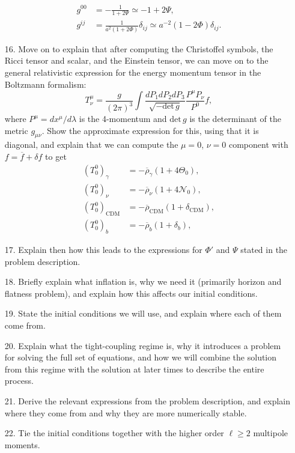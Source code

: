 \documentclass{aa}
\begin{document}
\begin{enumerate}
  \begin{align}
    g^{00} &= -\frac{1}{1+2\Psi} \simeq -1+2\Psi,
    \\
    g^{ij} &= \frac{1}{a^2\left(1+2\Phi \right)}\delta_{ij} \simeq a^{-2}\left(1-2\Phi\right)\delta_{ij}.
  \end{align}
  \item [16.] Move on to explain that after computing the Christoffel symbols, the Ricci tensor and scalar, and the Einstein tensor, we can move on to the general relativistic expression for the energy momentum tensor in the Boltzmann formalism:
  \begin{equation}
    T_\nu^\mu = \frac{g}{(2\pi)^3}\int\frac{dP_1dP_2dP_3}{\sqrt{-\text{det}\,g}}\frac{P^\mu P_\nu}{P^0}f,
  \end{equation}
  where $P^\mu=dx^\mu/d\lambda$ is the 4-momentum and $\text{det}\,g$ is the determinant of the metric $g_{\mu\nu}$. Show the approximate expression for this, using that it is diagonal, and explain that we can compute the $\mu=0$, $\nu=0$ component with $f=\overline{f}+\delta f$ to get
  \begin{align}
    \left(T_0^0\right)_\gamma &= -\overline{\rho}_\gamma\left(1+4\Theta_0\right),
    \\
    \left(T_0^0\right)_\nu &= -\overline{\rho}_\nu\left(1+4\mathcal{N}_0\right),
    \\
    \left(T_0^0\right)_\text{CDM} &= -\overline{\rho}_\text{CDM}\left(1+\delta_\text{CDM}\right),
    \\
    \left(T_0^0\right)_b &= -\overline{\rho}_b\left(1+\delta_b\right),
  \end{align}
  \item [17.] Explain then how this leads to the expressions for $\Phi'$ and $\Psi$ stated in the problem description. 
  \item [18.] Briefly explain what inflation is, why we need it (primarily horizon and flatness problem), and explain how this affects our initial conditions.
  \item [19.] State the initial conditions we will use, and explain where each of them come from.
  \item [20.] Explain what the tight-coupling regime is, why it introduces a problem for solving the full set of equations, and how we will combine the solution from this regime with the solution at later times to describe the entire process. 
  \item [21.] Derive the relevant expressions from the problem description, and explain where they come from and why they are more numerically stable.
  \item [22.] Tie the initial conditions together with the higher order $\ell\geq2$ multipole moments.
\end{enumerate}
\end{document}
